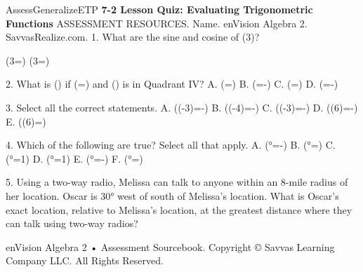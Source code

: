 \documentclass{article}
\newenvironment{te-addendum}[2]{}{}     %
\newcommand{\answer}[1]{}               %
\newcommand{\placeholder}[2]{}          %
\newcommand{\te}[1]{}                   %
\begin{document}
\begin{te-addendum}{Assess}{GeneralizeETP}
\textbf{7-2 Lesson Quiz: Evaluating Trigonometric Functions}
ASSESSMENT RESOURCES. Name. enVision Algebra 2. SavvasRealize.com.
1. What are the sine and cosine of (\frac{2\pi}3)?
\te{Choice tiles: (\frac{\sqrt3}{2}), (-\frac12), (\frac12), (-\frac{\sqrt3}{2}), (\sqrt3), 4.}
(\sin\frac{2\pi}3=) (\cos\frac{2\pi}3=)
\answer{(\sin\frac{2\pi}3=\frac{\sqrt3}{2}), (\cos\frac{2\pi}3=-\frac12)}
2. What is (\sin\theta) if (\cos\theta=) and (\theta) is in Quadrant IV?
A. (\sin\theta=)
B. (\sin\theta=-)
C. (\sin\theta=)
D. (\sin\theta=-)
\answer{B}
3. Select all the correct statements.
A. (\tan(-\frac{4\pi}3)=-)
B. (\cos(-\frac{7\pi}4)=-)
C. (\cot(-\frac{11\pi}3)=-)
D. (\sec(\frac{7\pi}6)=-)
E. (\sin(\frac{13\pi}6)=)
\answer{A, D, E}
4. Which of the following are true? Select all that apply.
A. (°=-)
B. (°=)
C. (°=1)
D. (°=1)
E. (°=-)
F. (°=)
\answer{A, C, E}
5. Using a two-way radio, Melissa can talk to anyone within an 8-mile radius of her location. Oscar is 30° west of south of Melissa's location. What is Oscar's exact location, relative to Melissa's location, at the greatest distance where they can talk using two-way radios?
\te{Choice tiles: -4, (-4\sqrt3), (2\sqrt3), (-3\sqrt4), 3, -2. Coordinate blanks (blank,blank).}
\placeholder{graph}{Black radius-8 circle centered O at Melissa, compass East/West and North/South arrowed axes, grid spacing 2 and +/-8 labels. Black radius southwest, angle 30° between radius and south axis.}
\answer{(-4,-4\sqrt3)}
enVision Algebra 2 • Assessment Sourcebook. Copyright © Savvas Learning Company LLC. All Rights Reserved.
\end{te-addendum}
\end{document}
